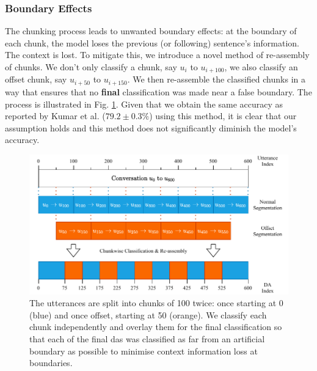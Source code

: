         \subsubsection{Boundary Effects}
            The chunking process leads to unwanted boundary effects: at the boundary of each chunk, the \gls{model} loses the previous (or following) sentence's information. The context is lost. To mitigate this, we introduce a novel method of re-assembly of chunks. We don't only classify a chunk, say $u_{i}$ to $u_{i + 100}$, we also classify an offset chunk, say $u_{i + 50}$ to $u_{i + 150}$. We then re-assemble the classified chunks in a way that ensures that no \textbf{final} classification was made near a false boundary. The process is illustrated in Fig. \ref{fig:chunking process}. Given that we obtain the same accuracy as reported by Kumar et al. ($79.2 \pm 0.3\%$)\cite{kumar2017dialogue} using this method, it is clear that our assumption holds and this method does not significantly diminish the \gls{model}'s accuracy.
        
    \begin{figure}[h]
        \centering
        \includegraphics[width=\textwidth]{figures/chunks.pdf}
        \caption{The \glspl{utterance} are split into chunks of 100 twice: once starting at 0 (blue) and once offset, starting at 50 (orange). We classify each chunk independently and overlay them for the final classification so that each of the final \glspl{da} was classified as far from an artificial boundary as possible to minimise context information loss at boundaries.}
        \label{fig:chunking process}
    \end{figure}
        
